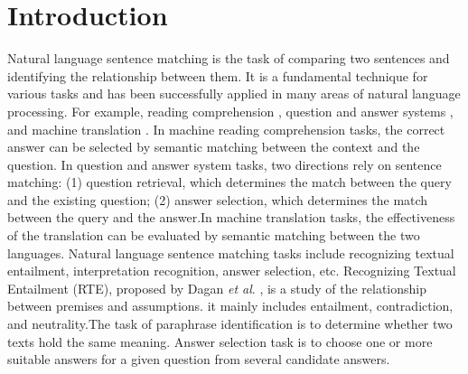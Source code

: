 \documentclass[review]{elsarticle}
\begin{document}
\section{Introduction}
Natural language sentence matching is the task of comparing two sentences and identifying the relationship between them. It is a fundamental technique for various tasks and has been successfully applied in many areas of natural language processing. For example, reading comprehension \cite{sugawara2020assessing}, question and answer systems \cite{liu2020asking}, and machine translation \cite{li2021incorporating}. In machine reading comprehension tasks, the correct answer can be selected by semantic matching between the context and the question. In question and answer system tasks, two directions rely on sentence matching: (1) question retrieval, which determines the match between the query and the existing question;  (2) answer selection, which determines the match between the query and the answer.In machine translation tasks, the effectiveness of the translation can be evaluated by semantic matching between the two languages. Natural language sentence matching tasks include 
recognizing textual entailment\cite{li2020sa}, interpretation recognition\cite{zhang2019deep}, answer selection\cite{wu2020building}, etc. Recognizing Textual Entailment (RTE), proposed by Dagan {\it et al}. \cite{dagan2004probabilistic}, is a study of the relationship between premises and assumptions. it mainly includes entailment, contradiction, and neutrality.The task of paraphrase identification is to determine whether two texts hold the same meaning. Answer selection task is to choose one or more suitable answers for a given question from several candidate answers.
\end{document}
